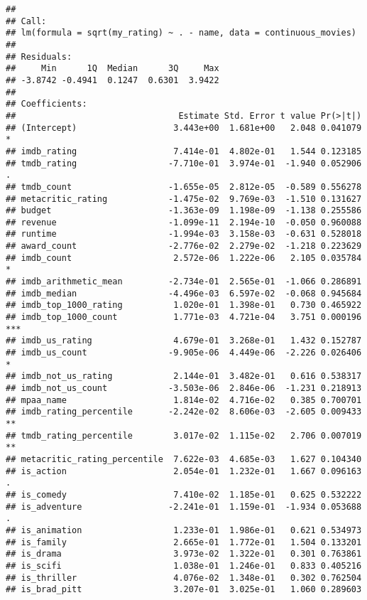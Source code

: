 \documentclass[
]{article}
\begin{document}
\begin{verbatim}
## 
## Call:
## lm(formula = sqrt(my_rating) ~ . - name, data = continuous_movies)
## 
## Residuals:
##     Min      1Q  Median      3Q     Max 
## -3.8742 -0.4941  0.1247  0.6301  3.9422 
## 
## Coefficients:
##                                Estimate Std. Error t value Pr(>|t|)    
## (Intercept)                   3.443e+00  1.681e+00   2.048 0.041079 *  
## imdb_rating                   7.414e-01  4.802e-01   1.544 0.123185    
## tmdb_rating                  -7.710e-01  3.974e-01  -1.940 0.052906 .  
## tmdb_count                   -1.655e-05  2.812e-05  -0.589 0.556278    
## metacritic_rating            -1.475e-02  9.769e-03  -1.510 0.131627    
## budget                       -1.363e-09  1.198e-09  -1.138 0.255586    
## revenue                      -1.099e-11  2.194e-10  -0.050 0.960088    
## runtime                      -1.994e-03  3.158e-03  -0.631 0.528018    
## award_count                  -2.776e-02  2.279e-02  -1.218 0.223629    
## imdb_count                    2.572e-06  1.222e-06   2.105 0.035784 *  
## imdb_arithmetic_mean         -2.734e-01  2.565e-01  -1.066 0.286891    
## imdb_median                  -4.496e-03  6.597e-02  -0.068 0.945684    
## imdb_top_1000_rating          1.020e-01  1.398e-01   0.730 0.465922    
## imdb_top_1000_count           1.771e-03  4.721e-04   3.751 0.000196 ***
## imdb_us_rating                4.679e-01  3.268e-01   1.432 0.152787    
## imdb_us_count                -9.905e-06  4.449e-06  -2.226 0.026406 *  
## imdb_not_us_rating            2.144e-01  3.482e-01   0.616 0.538317    
## imdb_not_us_count            -3.503e-06  2.846e-06  -1.231 0.218913    
## mpaa_name                     1.814e-02  4.716e-02   0.385 0.700701    
## imdb_rating_percentile       -2.242e-02  8.606e-03  -2.605 0.009433 ** 
## tmdb_rating_percentile        3.017e-02  1.115e-02   2.706 0.007019 ** 
## metacritic_rating_percentile  7.622e-03  4.685e-03   1.627 0.104340    
## is_action                     2.054e-01  1.232e-01   1.667 0.096163 .  
## is_comedy                     7.410e-02  1.185e-01   0.625 0.532222    
## is_adventure                 -2.241e-01  1.159e-01  -1.934 0.053688 .  
## is_animation                  1.233e-01  1.986e-01   0.621 0.534973    
## is_family                     2.665e-01  1.772e-01   1.504 0.133201    
## is_drama                      3.973e-02  1.322e-01   0.301 0.763861    
## is_scifi                      1.038e-01  1.246e-01   0.833 0.405216    
## is_thriller                   4.076e-02  1.348e-01   0.302 0.762504    
## is_brad_pitt                  3.207e-01  3.025e-01   1.060 0.289603    

\end{verbatim}
\end{document}
